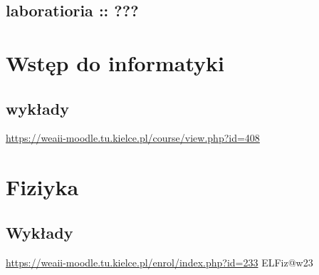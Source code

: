 \documentclass[11pt]{article}
\begin{document}
\subsection{laboratioria :: ???}
\label{sec:orgc9cc8f0}
\section{Wstęp do informatyki}
\label{sec:org2c3428e}
\subsection{wykłady}
\label{sec:orgb095717}
\url{https://weaii-moodle.tu.kielce.pl/course/view.php?id=408}
\section{Fiziyka}
\label{sec:org713dee2}
\subsection{Wykłady}
\label{sec:orgb9d3509}
\url{https://weaii-moodle.tu.kielce.pl/enrol/index.php?id=233} ELFiz@w23
\end{document}
